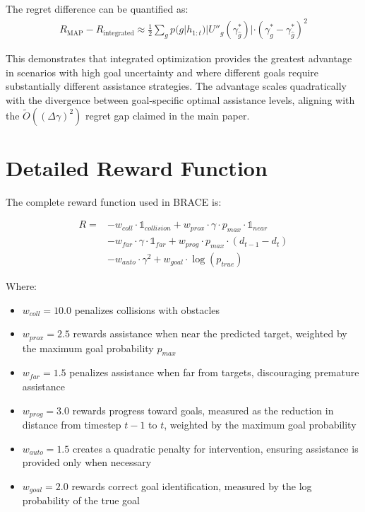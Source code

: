 \documentclass[11pt]{article}
\begin{document}
The regret difference can be quantified as:
\begin{align}
R_{\text{MAP}} - R_{\text{integrated}} \approx 
\frac{1}{2} \sum_g p(g|h_{1:t})|U''_g(\gamma^*_{\hat{g}})| \cdot (\gamma^*_g - \gamma^*_{\hat{g}})^2
\end{align}

This demonstrates that integrated optimization provides the greatest advantage in scenarios with 
high goal uncertainty and where different goals require substantially different assistance strategies. 
The advantage scales quadratically with the divergence between goal-specific optimal assistance levels, 
aligning with the $\tilde{O}((\Delta\gamma)^2)$ regret gap claimed in the main paper.












\section{Detailed Reward Function}
\label{sec:detailed_reward}
The complete reward function used in BRACE is:

\begin{equation}
\begin{split}
R = &-w_{coll} \cdot \mathds{1}_{collision} + w_{prox} \cdot \gamma \cdot p_{max} \cdot \mathds{1}_{near} \\
&- w_{far} \cdot \gamma \cdot \mathds{1}_{far} + w_{prog} \cdot p_{max} \cdot (d_{t-1} - d_t) \\
&- w_{auto} \cdot \gamma^2 + w_{goal} \cdot \log(p_{true})
\end{split}
\end{equation}

Where:
\begin{itemize}
\item $w_{coll} = 10.0$ penalizes collisions with obstacles
\item $w_{prox} = 2.5$ rewards assistance when near the predicted target, weighted by the maximum goal probability $p_{max}$
\item $w_{far} = 1.5$ penalizes assistance when far from targets, discouraging premature assistance
\item $w_{prog} = 3.0$ rewards progress toward goals, measured as the reduction in distance from timestep $t-1$ to $t$, weighted by the maximum goal probability
\item $w_{auto} = 1.5$ creates a quadratic penalty for intervention, ensuring assistance is provided only when necessary
\item $w_{goal} = 2.0$ rewards correct goal identification, measured by the log probability of the true goal
\end{itemize}
\end{document}
